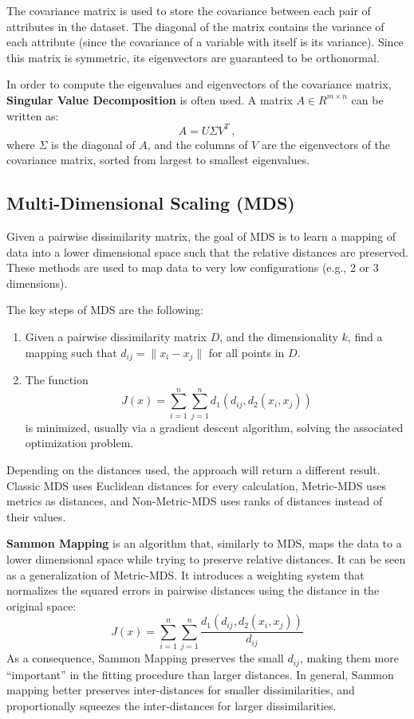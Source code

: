 The covariance matrix is used to store the covariance between each pair of attributes in the dataset. The diagonal of the matrix contains the variance of each attribute (since the covariance of a variable with itself is its variance). Since this matrix is symmetric, its eigenvectors are guaranteed to be orthonormal.

In order to compute the eigenvalues and eigenvectors of the covariance matrix, \textbf{Singular Value Decomposition} is often used. A matrix $A \in R^{m \times n}$ can be written as:
\begin{equation*}
    A = U \Sigma V^T \,,
\end{equation*}
where $\Sigma$ is the diagonal of $A$, and the columns of $V$ are the eigenvectors of the covariance matrix, sorted from largest to smallest eigenvalues.

\subsection{Multi-Dimensional Scaling (MDS)}

Given a pairwise dissimilarity matrix, the goal of MDS is to learn a mapping of data into a lower dimensional space such that the relative distances are preserved. These methods are used to map data to very low configurations (e.g., 2 or 3 dimensions).

The key steps of MDS are the following:
\begin{enumerate}
    \item Given a pairwise dissimilarity matrix $D$, and the dimensionality $k$, find a mapping such that $d_{ij} = \|x_i - x_j\|$ for all points in $D$.

    \item The function
    \begin{equation*}
        J(x) = \sum_{i=1}^n \sum_{j=1}^n d_1 (d_{ij}, d_2(x_i, x_j))
    \end{equation*}
    is minimized, usually via a gradient descent algorithm, solving the associated optimization problem.
\end{enumerate}
Depending on the distances used, the approach will return a different result. Classic MDS uses Euclidean distances for every calculation, Metric-MDS uses metrics as distances, and Non-Metric-MDS uses ranks of distances instead of their values.

\textbf{Sammon Mapping} is an algorithm that, similarly to MDS, maps the data to a lower dimensional space while trying to preserve relative distances. It can be seen as a generalization of Metric-MDS. It introduces a weighting system that normalizes the squared errors in pairwise distances using the distance in the original space:
\begin{equation*}
    J(x) = \sum_{i=1}^n \sum_{j=1}^n \dfrac{d_1 (d_{ij}, d_2(x_i, x_j))}{d_{ij}}
\end{equation*}
As a consequence, Sammon Mapping preserves the small $d_{ij}$, making them more ``important'' in the fitting procedure than larger distances. In general, Sammon mapping better preserves inter-distances for smaller dissimilarities, and proportionally squeezes the inter-distances for larger dissimilarities.

